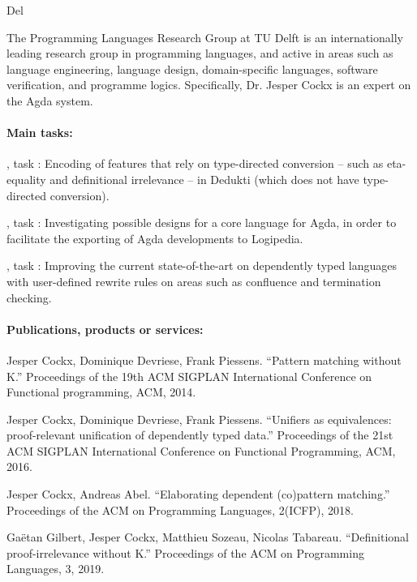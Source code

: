\begin{sitedescription}{Del}


The Programming Languages Research Group at TU Delft is an
internationally leading research group in programming languages, and
active in areas such as language engineering, language design,
domain-specific languages, software verification, and programme logics.
Specifically, Dr. Jesper Cockx is an expert on the Agda system.

\paragraph*{Main tasks:}

\begin{compactitem}
  \item {}, task :
  Encoding of features that rely on type-directed conversion -- such
  as eta-equality and definitional irrelevance -- in Dedukti (which
  does not have type-directed conversion).
  \item {}, task :
  Investigating possible designs for a core language for Agda, in
  order to facilitate the exporting of Agda developments to Logipedia.
  \item {}, task :
  Improving the current state-of-the-art on dependently typed
  languages with user-defined rewrite rules on areas such as
  confluence and termination checking.
\end{compactitem}

\paragraph*{Publications, products or services:}

\begin{compactitem}
  \item Jesper Cockx, Dominique Devriese, Frank Piessens. ``Pattern
  matching without K.'' Proceedings of the 19th ACM SIGPLAN
  International Conference on Functional programming, ACM, 2014.
  \item Jesper Cockx, Dominique Devriese, Frank Piessens. ``Unifiers
  as equivalences: proof-relevant unification of dependently typed
  data.'' Proceedings of the 21st ACM SIGPLAN International Conference
  on Functional Programming, ACM, 2016.
  \item Jesper Cockx, Andreas Abel. ``Elaborating dependent
  (co)pattern matching.'' Proceedings of the ACM on Programming
  Languages, 2(ICFP), 2018.
  \item Gaëtan Gilbert, Jesper Cockx, Matthieu Sozeau, Nicolas
  Tabareau. ``Definitional proof-irrelevance without K.'' Proceedings
  of the ACM on Programming Languages, 3, 2019.
\end{compactitem}


\end{sitedescription}
